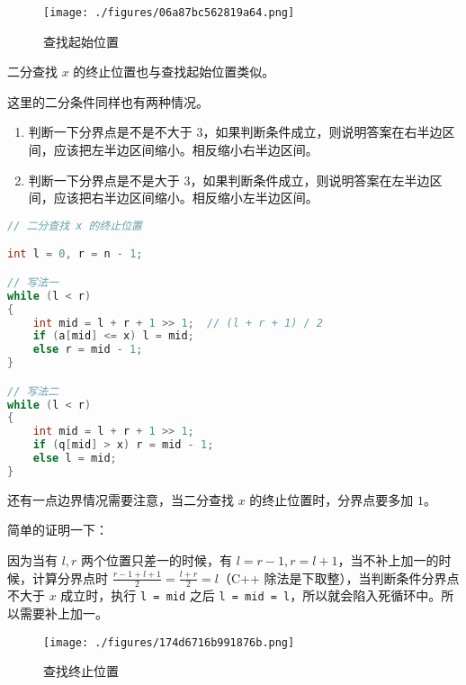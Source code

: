 \begin{figure}[ht]
\centering
\texttt{[image: ./figures/06a87bc562819a64.png]}
\caption{查找起始位置} \label{fig_BS_1}
\end{figure}


二分查找 $x$ 的终止位置也与查找起始位置类似。

这里的二分条件同样也有两种情况。

\begin{enumerate}
\item 判断一下分界点是不是不大于 $3$，如果判断条件成立，则说明答案在右半边区间，应该把左半边区间缩小。相反缩小右半边区间。
\item 判断一下分界点是不是大于 $3$，如果判断条件成立，则说明答案在左半边区间，应该把右半边区间缩小。相反缩小左半边区间。
\end{enumerate}
\begin{lstlisting}[language=cpp]
// 二分查找 x 的终止位置

int l = 0, r = n - 1;

// 写法一
while (l < r)
{
	int mid = l + r + 1 >> 1;  // (l + r + 1) / 2
    if (a[mid] <= x) l = mid;
    else r = mid - 1;
}

// 写法二
while (l < r)
{
    int mid = l + r + 1 >> 1;
    if (q[mid] > x) r = mid - 1;
    else l = mid;
}
\end{lstlisting}



还有一点边界情况需要注意，当二分查找 $x$ 的终止位置时，分界点要多加 $1$。

简单的证明一下：

因为当有 $l, r$ 两个位置只差一的时候，有 $l = r - 1, r = l + 1$，当不补上加一的时候，计算分界点时 $\frac{r - 1 + l + 1}{2} = \frac{l+r}{2}=l$（C++ 除法是下取整），当判断条件分界点不大于 $x$ 成立时，执行 \verb`l = mid` 之后 \verb`l = mid = l`，所以就会陷入死循环中。所以需要补上加一。

\begin{figure}[ht]
\centering
\texttt{[image: ./figures/174d6716b991876b.png]}
\caption{查找终止位置} \label{fig_BS_2}
\end{figure}
